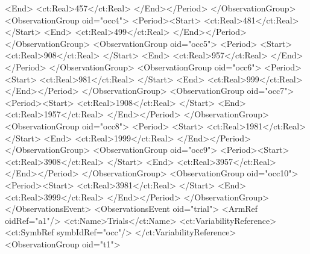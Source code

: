 \documentclass[a4paper,10pt]{article}
\begin{document}
\begin{xmlcode}
                    <End>
                        <ct:Real>457</ct:Real>
                    </End></Period>
                </ObservationGroup>
                <ObservationGroup oid="occ4">
                    <Period><Start>
                        <ct:Real>481</ct:Real>
                    </Start>
                    <End>
                        <ct:Real>499</ct:Real>
                    </End></Period>
                </ObservationGroup>
                <ObservationGroup oid="occ5">
                   <Period> <Start>
                        <ct:Real>908</ct:Real>
                    </Start>
                    <End>
                        <ct:Real>957</ct:Real>
                    </End></Period>
                </ObservationGroup>
                <ObservationGroup oid="occ6">
                    <Period><Start>
                        <ct:Real>981</ct:Real>
                    </Start>
                    <End>
                        <ct:Real>999</ct:Real>
                    </End></Period>
                </ObservationGroup>
                <ObservationGroup oid="occ7">
                    <Period><Start>
                        <ct:Real>1908</ct:Real>
                    </Start>
                    <End>
                        <ct:Real>1957</ct:Real>
                    </End></Period>
                </ObservationGroup>
                <ObservationGroup oid="occ8">
                   <Period> <Start>
                        <ct:Real>1981</ct:Real>
                    </Start>
                    <End>
                        <ct:Real>1999</ct:Real>
                    </End></Period>
                </ObservationGroup>
                <ObservationGroup oid="occ9">
                    <Period><Start>
                        <ct:Real>3908</ct:Real>
                    </Start>
                    <End>
                        <ct:Real>3957</ct:Real>
                    </End></Period>
                </ObservationGroup>
                <ObservationGroup oid="occ10">
                    <Period><Start>
                        <ct:Real>3981</ct:Real>
                    </Start>
                    <End>
                        <ct:Real>3999</ct:Real>
                    </End></Period>
                </ObservationGroup>
            </ObservationsEvent>
            <ObservationsEvent oid="trial">
                <ArmRef oidRef="a1"/>
                <ct:Name>Trials</ct:Name>
                <ct:VariabilityReference>
                    <ct:SymbRef symbIdRef="occ"/>
                </ct:VariabilityReference>
                <ObservationGroup oid="t1">

\end{xmlcode}
\end{document}
